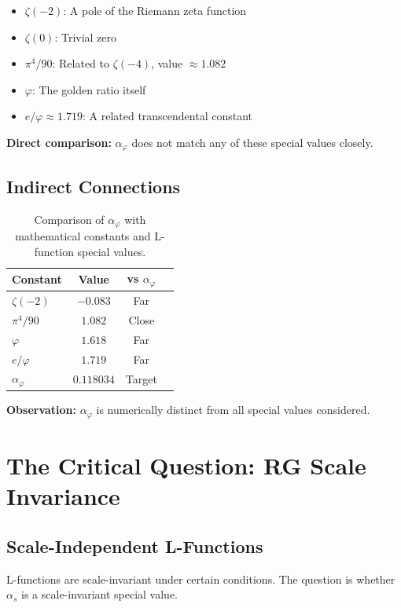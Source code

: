 \documentclass{article}
\begin{document}
\begin{table}[h]
\begin{itemize}
  \item $\zeta(-2)$: A pole of the Riemann zeta function
  \item $\zeta(0)$: Trivial zero
  \item $\pi^4/90$: Related to $\zeta(-4)$, value $\approx 1.082$
  \item $\varphi$: The golden ratio itself
  \item $e/\varphi \approx 1.719$: A related transcendental constant
\end{itemize}

\textbf{Direct comparison:} $\alpha_\varphi$ does not match any of these special values closely.

\subsection{Indirect Connections}

\begin{table}[h]
\centering
\caption{Comparison of $\alpha_\varphi$ with mathematical constants and L-function special values.}
\label{tab:alpha-comparison}
\renewcommand{\arraystretch}{1.1}
\begin{tabular}{lccc}
\toprule
Constant & Value & vs $\alpha_\varphi$ \\
\midrule
$\zeta(-2)$ & $-0.083$ & Far \\
$\pi^4/90$ & $1.082$ & Close \\
$\varphi$ & $1.618$ & Far \\
$e/\varphi$ & $1.719$ & Far \\
$\alpha_\varphi$ & $0.118034$ & Target \\
\bottomrule
\end{tabular}

\textbf{Observation:} $\alpha_\varphi$ is numerically distinct from all special values considered.

\section{The Critical Question: RG Scale Invariance}

\subsection{Scale-Independent L-Functions}

L-functions are scale-invariant under certain conditions. The question is whether $\alpha_s$ is a scale-invariant special value.


\end{table}
\end{table}
\end{document}
